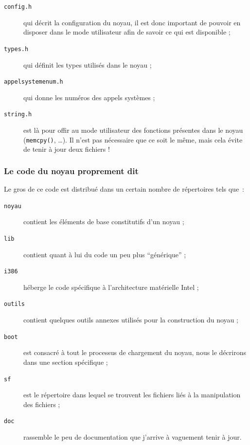 \begin{description}
   \item[{\tt config.h}] qui décrit la configuration du noyau, il est
     donc important de pouvoir en disposer dans le mode utilisateur
     afin de savoir ce qui est disponible ;
   \item[{\tt types.h}] qui définit les types utilisés dans le noyau ;
   \item[{\tt appelsystemenum.h}] qui donne les numéros des appels
     systèmes ;
   \item[{\tt string.h}] est là pour offir au mode utilisateur des
     fonctions présentes dans le noyau ({\tt memcpy()}, \ldots). Il
     n'est pas nécessaire que ce soit le même, mais cela évite de
     tenir à jour deux fichiers !
\end{description}

%
\subsubsection{Le code du noyau proprement dit}

   Le gros de ce code est distribué dans un certain nombre de
répertoires tels que~:
   
\begin{description}
   \item[{\tt noyau}] contient les éléments de base constitutifs d'un
     noyau ;
   \item[{\tt lib}] contient quant à lui du code un peu plus
     ``générique'' ;
   \item[{\tt i386}] héberge le code spécifique à l'architecture
     matérielle Intel ;
   \item[{\tt outils}] contient quelques outils annexes utilisés pour
     la construction du noyau ;
   \item[{\tt boot}] est consacré à tout le processus de chargement du
     noyau, nous le décrirons dans une section spécifique ;
   \item[{\tt sf}] est le répertoire dans lequel se trouvent les
     fichiers liés à la manipulation des fichiers ;
   \item[{\tt doc}] rassemble le peu de documentation que j'arrive à
     vaguement tenir à jour.
\end{description}

%   
